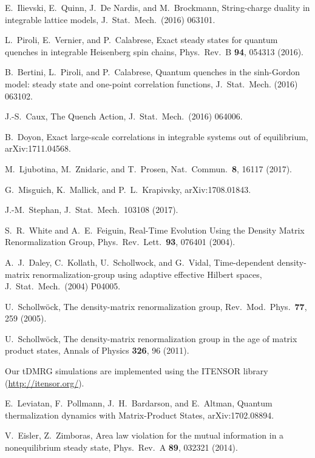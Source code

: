 \documentclass[twocolumn,superscriptaddress,prb,10pt]{revtex4-1}
\begin{document}
\begin{thebibliography}{99}
 E.~Ilievski, E.~Quinn, J.~De Nardis, and M.~Brockmann, String-charge duality in integrable lattice models, 
	J.\ Stat.\ Mech.\ (2016) 063101.

	L.~Piroli, E.~Vernier, and P.~Calabrese, Exact steady states for quantum quenches in integrable Heisenberg
	spin chains, Phys.\ Rev.\ B {\bf 94}, 054313 (2016).

	B.~Bertini, L.~Piroli, and P.~Calabrese, Quantum quenches in the sinh-Gordon model: steady state
	and one-point correlation functions, 
	J.\ Stat.\ Mech. (2016) 063102.

	J.-S.~Caux, The Quench Action, J.\ Stat.\ Mech.\ (2016) 064006.

B.~Doyon, Exact large-scale correlations in integrable systems out of equilibrium, arXiv:1711.04568. 


M.~Ljubotina, M.~Znidaric, and T.~Prosen, Nat.\ Commun.\ {\bf 8}, 16117 (2017). 

G.~Misguich, K.~Mallick, and P.~L.~Krapivsky, arXiv:1708.01843. 

J.-M.~Stephan,  J.\ Stat.\ Mech.\ 103108 (2017). 


S.~R.~White and A.~E.~Feiguin,  
Real-Time Evolution Using the Density Matrix Renormalization Group, 
Phys.\ Rev.\ Lett.\ {\bf 93}, 076401 (2004).

A.~J.~Daley, C.~Kollath, U.~Schollwock, and G.~Vidal,  
Time-dependent density-matrix renormalization-group using adaptive effective Hilbert spaces, 
J.\ Stat.\ Mech.\ (2004) P04005.

U.~Schollw\"ock,  
The density-matrix renormalization group, 
Rev.\ Mod.\ Phys.\ {\bf 77}, 259 (2005).

U.~Schollw\"ock,  
The density-matrix renormalization group in the age of matrix product states, 
Annals of Physics {\bf 326}, 96 (2011). 

	Our tDMRG simulations are implemented using the ITENSOR library (\url{http://itensor.org/}). 

E.~Leviatan, F.~Pollmann, J.~H.~Bardarson, and E.~Altman, 
Quantum thermalization dynamics with Matrix-Product States, 
arXiv:1702.08894. 

	V.~Eisler, Z.~Zimboras, 
	Area law violation for the mutual information in a nonequilibrium steady state, 
	Phys.\ Rev.\ A {\bf 89}, 032321 (2014). 


\end{thebibliography}
\end{document}

